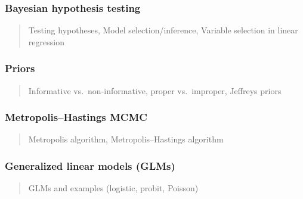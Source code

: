 \documentclass[12pt]{article}
\begin{document}
\subsubsection*{Bayesian hypothesis testing}
\begin{quote}
Testing hypotheses, Model selection/inference, Variable selection in linear regression
\end{quote}


\subsubsection*{Priors}
\begin{quote}
Informative vs.\ non-informative, proper vs.\ improper, Jeffreys priors %
\end{quote}

\subsubsection*{Metropolis--Hastings MCMC}
\begin{quote}
Metropolis algorithm, Metropolis--Hastings algorithm
\end{quote}

\subsubsection*{Generalized linear models (GLMs)}
\begin{quote}
GLMs and examples (logistic, probit, Poisson) %
\end{quote}

\end{document}
